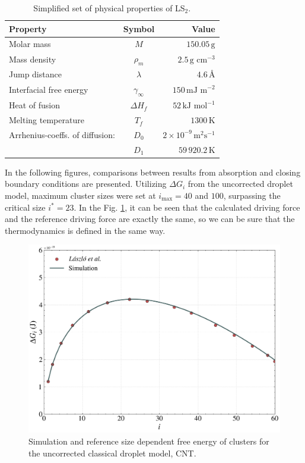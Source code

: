 \begin{table}[ht]
	\caption{Simplified set of physical properties of LS$_2$.}
	\label{table:properties_ls2}
	\begin{center}
	\begin{tabular}{l c r}
	\hline
	Property & Symbol & Value \\
	\hline
	Molar mass & $M$ & $150.05 \, \text{g}$ \\
	Mass density & $\rho_m$ & $2.5 \, \text{g cm}^{-3}$ \\
	Jump distance & $\lambda$ & $4.6 \, \text{\AA}$ \\
	Interfacial free energy & $\gamma_\infty$ & $150 \, \text{mJ m}^{-2}$ \\
	Heat of fusion & $\Delta H_f$ & $52 \, \text{kJ mol}^{-1}$ \\
	Melting temperature & $T_f$ & $1300 \, \text{K}$ \\
	Arrhenius-coeffs. of diffusion: & $D_0$ & $2 \times 10^{-9} \, \text{m}^2 \text{s}^{-1}$ \\
	& $D_1$ & $59\,920.2 \, \text{K}$ \\
	\hline
	\end{tabular}
	\end{center}
\end{table}
	
In the following figures, comparisons between results from absorption and closing boundary conditions are presented. Utilizing $\Delta G_i$ from the 
uncorrected droplet model, maximum cluster sizes were set at $i_{\text{max}} = 40$ and $100$, surpassing the critical size $i^* = 23$. 
In the Fig. \ref{fig:free_energy_comparison}, it can be seen that the calculated driving force and the reference driving force are exactly the same, so we can be sure that the 
thermodynamics is defined in the same way.
\begin{figure}[H]
    \centering
    \includegraphics[width=0.9\linewidth]{laszlo_results/free_energy_comparison.png}
    \caption{Simulation and reference size dependent free energy of clusters for the uncorrected classical droplet model, CNT.}
    \label{fig:free_energy_comparison}
\end{figure}

